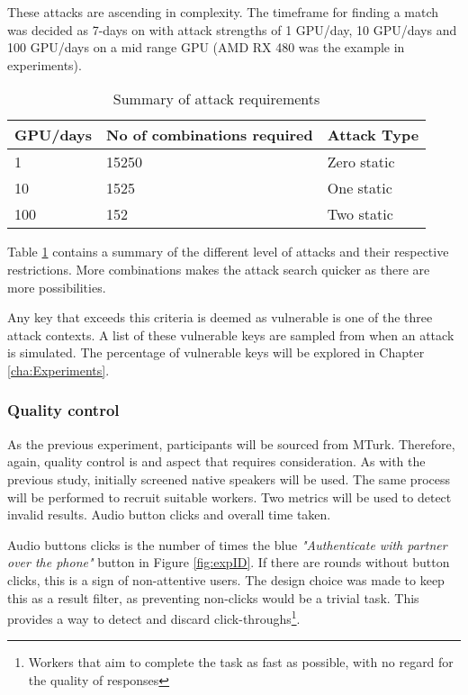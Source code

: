These attacks are ascending in complexity. The timeframe for finding a match was decided as 7-days on with attack strengths of 1 GPU/day, 10 GPU/days and 100 GPU/days on a mid range GPU (AMD RX 480 was the example in experiments). 

\begin{table}[h!]
    \centering
    \begin{tabular}{lll}
        GPU/days & No of combinations required & Attack Type \\
        \hline
        1       & 15250   & Zero static\\
        10      & 1525    & One static\\
        100     & 152     & Two static\\        
    \end{tabular}
    \caption{Summary of attack requirements}
    \label{tab:attackReq}
\end{table}

Table \ref{tab:attackReq} contains a summary of the different level of attacks and their respective restrictions. More combinations makes the attack search quicker as there are more possibilities.

Any key that exceeds this criteria is deemed as vulnerable is one of the three attack contexts. A list of these vulnerable keys are sampled from when an attack is simulated. The percentage of vulnerable keys will be explored in Chapter \ref{cha:Experiments}.

\subsubsection{Quality control}
As the previous experiment, participants will be sourced from MTurk. Therefore, again, quality control is and aspect that requires consideration. As with the previous study, initially screened native speakers will be used. The same process will be performed to recruit suitable workers. Two metrics will be used to detect invalid results. Audio button clicks and overall time taken. 

Audio buttons clicks is the number of times the blue \textit{"Authenticate with partner over the phone"} button in Figure \ref{fig:expID}. If there are rounds without button clicks, this is a sign of non-attentive users. The design choice was made to keep this as a result filter, as preventing non-clicks would be a trivial task. This provides a way to detect and discard click-throughs\footnote{Workers that aim to complete the task as fast as possible, with no regard for the quality of responses}. 

